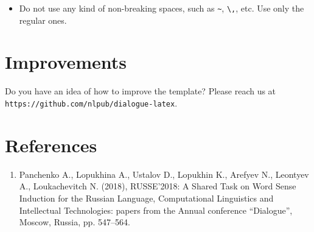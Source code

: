 \documentclass{dialogue}
\begin{document}
\begin{itemize}
  \item Do not use any kind of non-breaking spaces, such as \verb|~|, \verb|\,|, etc. Use only the regular ones.
\end{itemize}

\section{Improvements}

Do you have an idea of how to improve the template? Please reach us at\\\texttt{https://github.com/nlpub/dialogue-latex}.

\color{blue}\section*{References}

\begin{enumerate}
  \item Panchenko A., Lopukhina A., Ustalov D., Lopukhin K., Arefyev N., Leontyev A., Loukachevitch N. (2018), RUSSE'2018: A Shared Task on Word Sense Induction for the Russian Language, Computational Linguistics and Intellectual Technologies: papers from the Annual conference ``Dialogue'', Moscow, Russia, pp. 547--564.
\end{enumerate}
\end{document}
